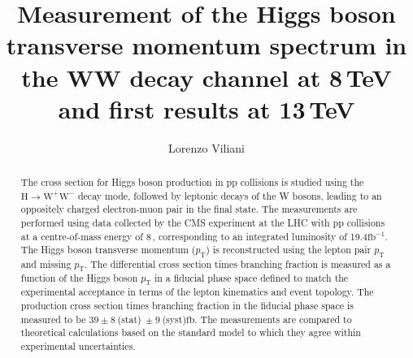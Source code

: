 \documentclass[english,12pt,booktabs,hyperref,titling,twoside,openright]{hepthesis}
\let\oldTeV\TeV
\renewcommand{\TeV}{\,\oldTeV \xspace}
\newcommand{\fb}{\ensuremath{\mathrm{fb}}\xspace}
\newcommand{\ifb}{\ensuremath{\mathrm{fb^{-1}}}\xspace}
\newcommand{\pt}{\ensuremath{p_\mathrm{T}}\xspace}
\begin{document}
\begin{frontmatter}

\title{Measurement of the Higgs boson transverse momentum spectrum in the WW decay channel at 8\,TeV and first results at 13\,TeV}
\author{Lorenzo Viliani}


\begin{abstract}
The cross section for Higgs boson production in pp collisions is studied using the $\mathrm{H} \to \mathrm{W}^+ \mathrm{W}^-$  decay mode, followed by leptonic decays of the W bosons, leading to an oppositely charged electron-muon pair in the final state. 
The measurements are performed using data collected by the CMS experiment at the LHC with pp collisions at a centre-of-mass energy of 8\TeV, corresponding to an integrated luminosity of 19.4\ifb.
The Higgs boson transverse momentum (\pt) is reconstructed using the lepton pair \pt and missing \pt. The differential cross section times branching fraction is measured as a function of the Higgs boson \pt in a fiducial phase space defined to match the experimental acceptance in terms of the lepton kinematics and event topology. The production cross section times branching fraction in the fiducial phase space is measured to be $39 \pm 8~$(stat)$~\pm 9~$(syst)\fb. The measurements are compared to theoretical calculations based on the standard model to which they agree within experimental uncertainties.
\end{abstract}

\cleardoublepage
\pagestyle{fancy}
\fancyhead{}
\fancyfoot{}
\fancyhead[RO]{\thepage}
\fancyhead[LE]{\thepage}
\tableofcontents
\cleardoublepage

\end{frontmatter}

\begin{mainmatter}








\clearpage
\appendix

\end{mainmatter}

\begin{backmatter}

\clearpage\thispagestyle{empty}\cleardoublepage
{}
\printbibliography
\clearpage\thispagestyle{empty}\cleardoublepage

\end{backmatter}
\end{document}
